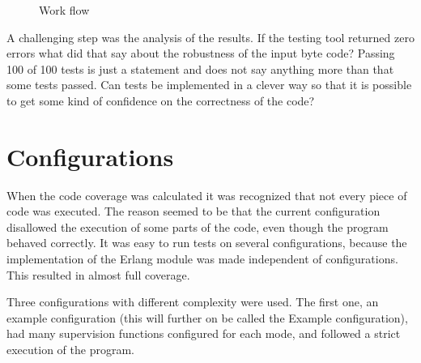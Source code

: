 \begin{figure}[!ht]
  \caption{Work flow}
  \label{fig:workflow}
\end{figure}

A challenging step was the analysis of the results. If the testing tool
returned zero errors what did that say about the robustness of the
input byte code? Passing 100 of 100 tests is just a statement and does
not say anything more than that some tests passed. Can tests be
implemented in a clever way so that it is possible to get some kind of
confidence on the correctness of the code?

\section{Configurations}
When the code coverage was calculated it was recognized that not every
piece of code was executed. The reason seemed to be that the
current configuration disallowed the execution of some parts of the
code, even though the program behaved correctly. It was easy to run
tests on several configurations, because the implementation of the
Erlang module was made independent of configurations. This resulted in
almost full coverage.

Three configurations with different complexity were used. The first
one, an example configuration (this will further on be called the
Example configuration), had many supervision functions configured for
each mode, and followed a strict execution of the program.

